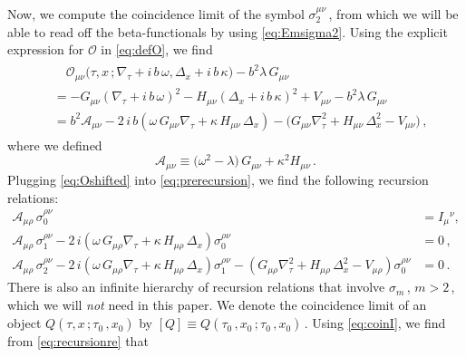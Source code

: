 \documentclass[11pt]{article}
\newcommand{\be}{\begin{equation}}
\newcommand{\ee}{\end{equation}}
\newcommand{\CA}{\mathcal{A}}
\newcommand{\CO}{\mathcal{O}}
\newcommand{\lr}{\left (}
\newcommand{\rr}{\right )}
\begin{document}
Now, we compute the coincidence limit of the symbol $\sigma^{\mu\nu}_2$\,, from which we will be able to read off the beta-functionals by using \eqref{eq:Emsigma2}.
Using the explicit expression for $\CO$ in \eqref{eq:defO}, we find
%
\begin{align} \label{eq:Oshifted}
\begin{split}
	& \quad \CO_{\mu\nu} \bigl( \tau, x\,; \nabla_{\!\tau} + i \, b \, \omega, \Delta_x + i \, b \, \kappa \bigr) - b^2 \lambda \, G_{\mu\nu} \\[2pt]
	& = - G_{\mu\nu} \lr \nabla_{\!\tau} + i \, b \, \omega \rr^2 - H_{\mu\nu} \lr \Delta_x + i \, b \, \kappa \rr^2 + V_{\mu\nu} - b^2 \lambda \, G_{\mu\nu} \\[2pt]
	& = b^2 \CA_{\mu\nu} - 2 \, i \, b \lr \omega \, G_{\mu\nu} \nabla_{\!\tau} + \kappa \, H_{\mu\nu} \, \Delta_x \rr - \bigl( G_{\mu\nu} \nabla_{\!\tau}^2 + H_{\mu\nu} \, \Delta_x^2 - V_{\mu\nu} \bigr)\,,
\end{split}
\end{align}
%
where we defined 
%
\be \label{eq:AGH}
	\CA_{\mu\nu} \equiv \bigl( \omega^2 - \lambda \bigr) \, G_{\mu\nu} + \kappa^2 H_{\mu\nu}\,.
\ee
%
Plugging \eqref{eq:Oshifted} into \eqref{eq:prerecursion}, we find the following recursion relations:
%
\begin{subequations} \label{eq:recursionre}
\begin{align}
	\CA_{\mu\rho} \,\sigma_0^{\rho\nu} & = I_\mu{}^\nu, \\[2pt]
	\CA_{\mu\rho} \, \sigma_1^{\rho\nu} - 2 \, i \lr \omega \, G_{\mu\rho} \nabla_{\!\tau} + \kappa \, H_{\mu\rho} \, \Delta_x \rr \sigma_0^{\rho\nu} & = 0\,, \\[2pt]
	\CA_{\mu\rho} \, \sigma_2^{\rho\nu} - 2 \, i \lr \omega \, G_{\mu\rho} \nabla_{\!\tau} + \kappa \, H_{\mu\rho} \, \Delta_x \rr \sigma_1^{\rho\nu} - \lr G_{\mu\rho} \nabla_{\!\tau}^2 + H_{\mu\rho} \, \Delta_x^2 - V_{\mu\rho} \rr \sigma_0^{\rho\nu} & = 0\,.
\end{align}
\end{subequations}
%
There is also an infinite hierarchy of recursion relations that involve $\sigma_m$\,, $m > 2$\,, which we will \emph{not} need in this paper. We denote the coincidence limit of an object $Q (\tau, x\,; \tau^{}_0\,, x^{}_0)$ by $[Q] \equiv Q (\tau^{}_0\,, x^{}_0\,; \tau^{}_0\,, x^{}_0)$\,.  
Using \eqref{eq:coinI}, we find from \eqref{eq:recursionre} that
%
\end{document}
